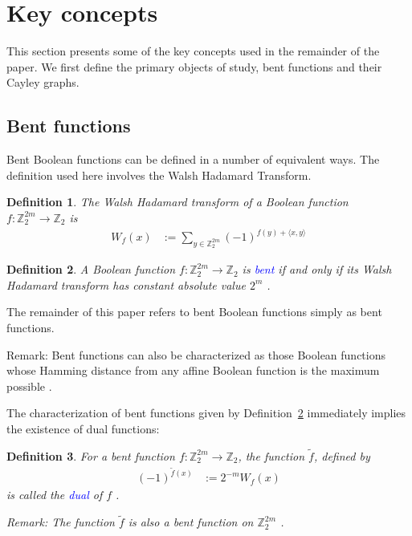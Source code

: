 \documentclass[12pt,a4paper]{article}
\newcommand{\mb}[1]{\mathbb{#1}}
\newcommand{\Z}{\mb{Z}}
\newcommand{\To}{\rightarrow}
\newcommand{\Emph}[1]{\emph{\textcolor{blue}{#1}}}
\newcommand{\dual}[1]{\widetilde{#1}}
\newtheorem{Definition}{Definition}
\begin{document}
\section{Key concepts}
\label{sec-Preliminaries}

This section presents some of the key concepts used in the remainder of the paper.
We first define the primary objects of study, bent functions and their Cayley graphs.

\subsection{Bent functions}

Bent Boolean functions can be defined in a number of equivalent ways.
The definition used here involves the Walsh Hadamard Transform.
\begin{Definition}
\label{def-Walsh-Hadamard-transform}
The Walsh Hadamard transform of
a Boolean function $f : \Z_2^{2m} \To \Z_2$ is
\begin{align*}
W_f(x)
&:=
\sum_{y \in \Z_2^{2m}} (-1)^{f(y) + \langle x, y \rangle}
\end{align*}
\end{Definition}

\begin{Definition}
\label{def-Bent-function}
A Boolean function $f : \Z_2^{2m} \To \Z_2$ is \Emph{bent}
if and only if its Walsh Hada\-mard transform has constant absolute value $2^{m}$ \cite[p. 74]{Dil74}
\cite[p. 300]{Rot76}.
\end{Definition}

The remainder of this paper refers to bent Boolean functions simply as bent functions.

Remark: Bent functions can also be characterized as those Boolean functions whose Hamming distance
from any affine Boolean function is the maximum possible \cite[Theorem 3.3]{MeiS90}.

The characterization of bent functions given by Definition~\ref{def-Bent-function} immediately
implies the existence of dual functions:
\begin{Definition}
\label{def-dual-Bent-function}
For a bent function $f : \Z_2^{2m} \To \Z_2$, the function $\dual{f}$, defined by
\begin{align*}
(-1)^{\dual{f}(x)} &:= 2^{-m} W_f(x)
\end{align*}
is called the \Emph{dual} of $f$ \cite{Tok11number}.

Remark: The function $\dual{f}$ is also a bent function on $\Z_2^{2m}$ \cite[p. 301]{Rot76}.
\end{Definition}
\end{document}

